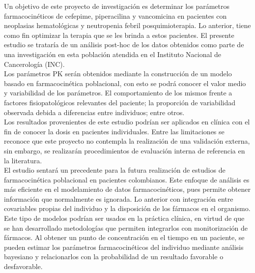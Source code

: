 \noindent
Un objetivo de este proyecto de investigación es determinar los parámetros farmacocinéticos de cefepime, piperacilina y vancomicina en pacientes con neoplasias hematológicas y neutropenia febril posquimioterapia. Lo anterior, tiene como fin optimizar la terapia que se les brinda a estos pacientes. El presente estudio se trataría de un análisis post-hoc de los datos obtenidos como parte de una investigación en esta población atendida en el Instituto Nacional de Cancerología (INC). \\

\noindent
Los parámetros PK serán obtenidos mediante la construcción de un modelo basado en farmacocinética poblacional, con esto se podrá conocer el valor medio y variabilidad de los parámetros. El comportamiento de los mismos frente a factores fisiopatológicos relevantes del paciente; la proporción de variabilidad observada debida a diferencias entre individuos; entre otros. \\

\noindent
Los resultados provenientes de este estudio podrían ser aplicados en clínica con el fin de conocer la dosis en pacientes individuales. Entre las limitaciones se reconoce que este proyecto no contempla la realización de una validación externa, sin embargo, se realizarán procedimientos de evaluación interna de referencia en la literatura.\\

\noindent
El estudio sentará un precedente para la futura realización de estudios de farmacocinética poblacional en pacientes colombianos. Este enfoque de análisis es más eficiente en el modelamiento de datos farmacocinéticos, pues permite obtener información que normalmente es ignorada. Lo anterior con integración entre covariables propias del individuo y la disposición de los fármacos en el organismo. Este tipo de modelos podrían ser usados en la práctica clínica, en virtud de que se han desarrollado metodologías que permiten integrarlos con monitorización de fármacos. Al obtener un punto de concentración en el tiempo en un paciente, se pueden estimar los parámetros farmacocinéticos del individuo mediante análisis bayesiano y relacionarlos con la probabilidad de un resultado favorable o desfavorable.\\
